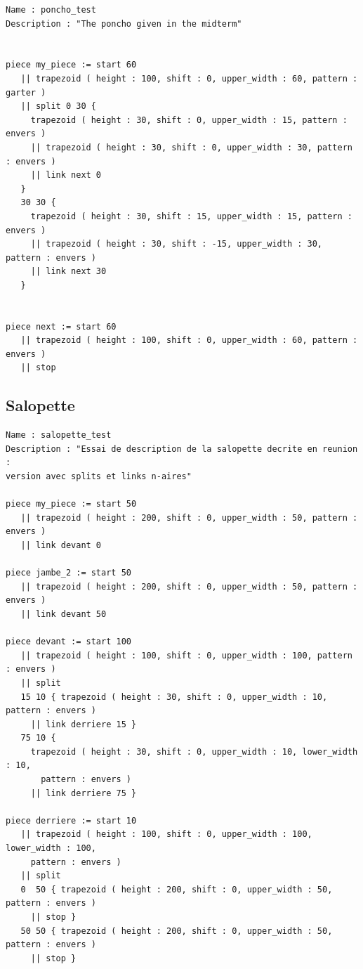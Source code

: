 \documentclass[a4paper,10pt]{article}
\begin{document}
\begin{lstlisting}
Name : poncho_test
Description : "The poncho given in the midterm"


piece my_piece := start 60
   || trapezoid ( height : 100, shift : 0, upper_width : 60, pattern : garter )
   || split 0 30 { 
     trapezoid ( height : 30, shift : 0, upper_width : 15, pattern : envers )
     || trapezoid ( height : 30, shift : 0, upper_width : 30, pattern : envers )
     || link next 0
   }
   30 30 { 
     trapezoid ( height : 30, shift : 15, upper_width : 15, pattern : envers )
     || trapezoid ( height : 30, shift : -15, upper_width : 30, pattern : envers )
     || link next 30
   }


piece next := start 60
   || trapezoid ( height : 100, shift : 0, upper_width : 60, pattern : envers )
   || stop
\end{lstlisting}

\newpage

\subsection{Salopette}

%

\begin{lstlisting}
Name : salopette_test
Description : "Essai de description de la salopette decrite en reunion : 
version avec splits et links n-aires"

piece my_piece := start 50
   || trapezoid ( height : 200, shift : 0, upper_width : 50, pattern : envers )
   || link devant 0

piece jambe_2 := start 50
   || trapezoid ( height : 200, shift : 0, upper_width : 50, pattern : envers )
   || link devant 50

piece devant := start 100
   || trapezoid ( height : 100, shift : 0, upper_width : 100, pattern : envers )
   || split
   15 10 { trapezoid ( height : 30, shift : 0, upper_width : 10, pattern : envers )
     || link derriere 15 }
   75 10 { 
     trapezoid ( height : 30, shift : 0, upper_width : 10, lower_width : 10, 
       pattern : envers )
     || link derriere 75 }

piece derriere := start 10
   || trapezoid ( height : 100, shift : 0, upper_width : 100, lower_width : 100, 
     pattern : envers )
   || split
   0  50 { trapezoid ( height : 200, shift : 0, upper_width : 50, pattern : envers )
     || stop }
   50 50 { trapezoid ( height : 200, shift : 0, upper_width : 50, pattern : envers )
     || stop }
\end{lstlisting}
\end{document}
